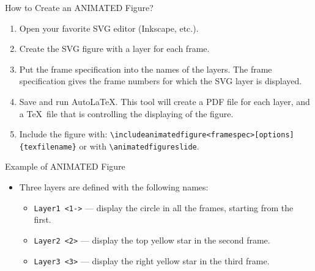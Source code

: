 \documentclass[english,sectioncirclenumberstyle]{ciadbeamer}
\begin{document}
\begin{frame}{How to Create an ANIMATED Figure?}
	\smaller
	\begin{enumerate}
	\item Open your favorite SVG editor (Inkscape, etc.).
	\item Create the SVG figure with a layer for each frame.
	\item Put the frame specification into the names of the layers. The frame specification gives the frame numbers for which the SVG layer is displayed. 
	\item Save and run AutoLaTeX. This tool will create a PDF file for each layer, and a \TeX\ file that is controlling the displaying of the figure.
	\item Include the figure with: \texttt{{\textbackslash}includeanimatedfigure<framespec>[options]\{texfilename\}} or with \texttt{{\textbackslash}animatedfigureslide}.
	\end{enumerate}
\end{frame}

\begin{frame}{Example of ANIMATED Figure}
	\begin{itemize}
	\item Three layers are defined with the following names:
		\begin{itemize}
		\item \texttt{Layer1 <1->} --- display the circle in all the frames, starting from the first.
		\item \texttt{Layer2 <2>} --- display the top yellow star in the second frame.
		\item \texttt{Layer3 <3>} --- display the right yellow star in the third frame.
		\end{itemize}
	\end{itemize}
	\begin{center}
	\end{center}
\end{frame}
\end{document}
